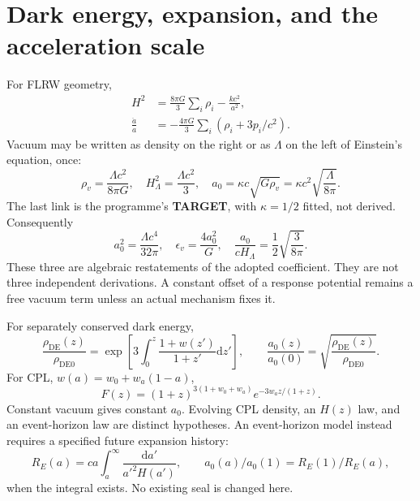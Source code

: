 \documentclass[11pt]{article}
\newcommand{\dd}{\mathrm d}
\newcommand{\DE}{\mathrm{DE}}
\begin{document}
\section{Dark energy, expansion, and the acceleration scale}
For FLRW geometry,
\begin{align}
 H^2&=\frac{8\pi G}{3}\sum_i\rho_i-\frac{k c^2}{a^2},\\
 \frac{\ddot a}{a}&=-\frac{4\pi G}{3}\sum_i(\rho_i+3p_i/c^2).
\end{align}
Vacuum may be written as density on the right or as $\Lambda$ on the left
of Einstein's equation, once:
\begin{equation}
 \rho_v=\frac{\Lambda c^2}{8\pi G},\quad
 H_\Lambda^2=\frac{\Lambda c^2}{3},\quad
 a_0=\kappa c\sqrt{G\rho_v}
 =\kappa c^2\sqrt{\frac{\Lambda}{8\pi}}.
\label{eq:scale}
\end{equation}
The last link is the programme's \textbf{TARGET}, with $\kappa=1/2$ fitted,
not derived. Consequently
\begin{equation}
 a_0^2=\frac{\Lambda c^4}{32\pi},\quad
 \epsilon_v=\frac{4a_0^2}{G},\quad
 \frac{a_0}{cH_\Lambda}=\frac{1}{2}\sqrt{\frac{3}{8\pi}}.
\end{equation}
These three are algebraic restatements of the adopted coefficient.
They are not three independent derivations. A constant offset of a response
potential remains a free vacuum term unless an actual mechanism fixes it.

For separately conserved dark energy,
\begin{equation}
 \frac{\rho_\DE(z)}{\rho_{\DE0}}
 =\exp\!\left[3\int_0^z\frac{1+w(z')}{1+z'}\dd z'\right],\qquad
 \frac{a_0(z)}{a_0(0)}=\sqrt{\frac{\rho_\DE(z)}{\rho_{\DE0}}}.
\end{equation}
For CPL, $w(a)=w_0+w_a(1-a)$,
\begin{equation}
 F(z)=(1+z)^{3(1+w_0+w_a)}e^{-3w_a z/(1+z)}.
\end{equation}
Constant vacuum gives constant $a_0$. Evolving CPL density, an $H(z)$ law,
and an event-horizon law are distinct hypotheses. An event-horizon model
instead requires a specified future expansion history:
\begin{equation}
 R_E(a)=ca\int_a^\infty\frac{\dd a'}{a'^2 H(a')},\qquad
 a_0(a)/a_0(1)=R_E(1)/R_E(a),
\end{equation}
when the integral exists. No existing seal is changed here.
\end{document}
